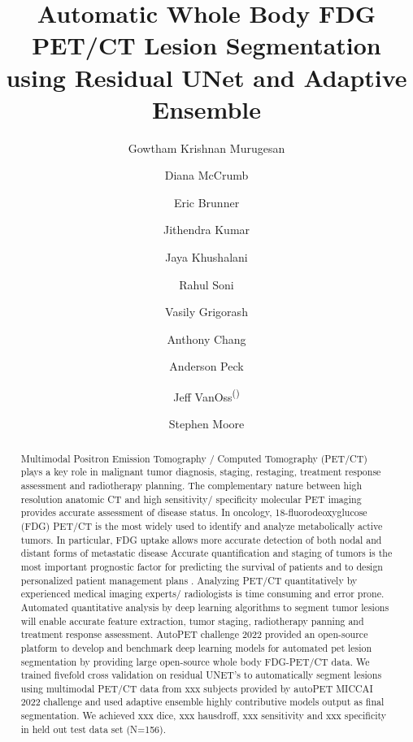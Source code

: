 \documentclass[runningheads]{llncs}
\begin{document}
%
\title{Automatic Whole Body FDG PET/CT Lesion Segmentation using Residual UNet and Adaptive Ensemble}
%
%
\author{Gowtham Krishnan Murugesan \and
    Diana McCrumb \and
    Eric Brunner\and
    Jithendra Kumar \and
    Jaya Khushalani \and
    Rahul Soni \and
    Vasily Grigorash \and
    Anthony Chang \and
    Anderson Peck \and
    Jeff VanOss\textsuperscript{(\Letter)} \and
    Stephen Moore}

%
%
%
\maketitle              %
%
\begin{abstract}
    Multimodal Positron Emission Tomography / Computed Tomography (PET/CT) plays a key role in malignant tumor diagnosis, staging, restaging, treatment response assessment and radiotherapy planning. The complementary nature between high resolution anatomic CT and high sensitivity/ specificity molecular PET imaging provides accurate assessment of disease status\cite{zaidi2008clinical}. In oncology, 18-fluorodeoxyglucose (FDG) PET/CT is the most widely used to identify and analyze metabolically active tumors.  In particular, FDG uptake allows more accurate detection of both nodal and distant forms of metastatic disease Accurate quantification and staging of tumors is the most important prognostic factor for predicting the survival of patients and to design personalized patient management plans \cite{kinahan2009pet}\cite{dirks2022computer}. Analyzing PET/CT quantitatively by experienced medical imaging experts/ radiologists is time consuming and error prone. Automated quantitative analysis by deep learning algorithms to segment tumor lesions will enable accurate feature extraction, tumor staging, radiotherapy panning and treatment response assessment. AutoPET challenge 2022 provided an open-source platform to develop and benchmark deep learning models for automated pet lesion segmentation by providing large open-source whole body FDG-PET/CT data. We trained fivefold cross validation on residual UNET’s to automatically segment lesions using multimodal PET/CT data from xxx subjects provided by autoPET MICCAI 2022 challenge and used adaptive ensemble highly contributive models output as final segmentation. We achieved xxx dice, xxx hausdroff, xxx sensitivity and xxx specificity in held out test data set (N=156).


\end{abstract}
%
%
%
\end{document}
